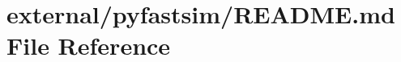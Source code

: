 \hypertarget{external_2pyfastsim_2_r_e_a_d_m_e_8md}{}\section{external/pyfastsim/\+R\+E\+A\+D\+ME.md File Reference}
\label{external_2pyfastsim_2_r_e_a_d_m_e_8md}
